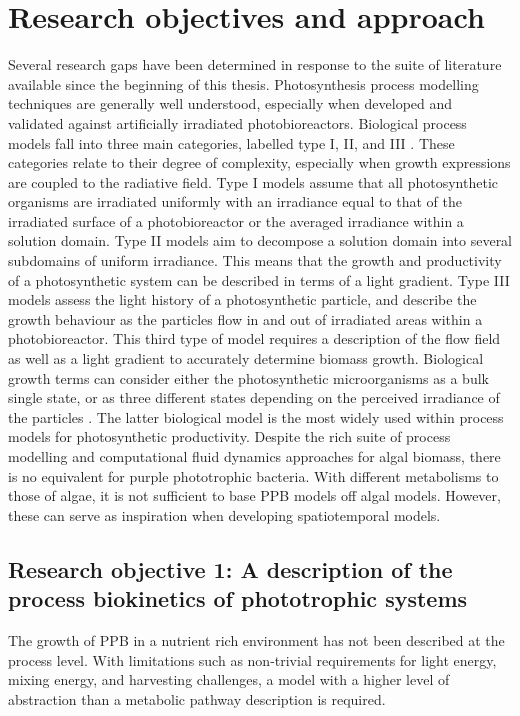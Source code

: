 \section{Research objectives and approach}
\label{Intro:Objectives}
Several research gaps have been determined in response to the suite of literature available since the beginning of this thesis. Photosynthesis process modelling techniques are generally well understood, especially when developed and validated against artificially irradiated photobioreactors. Biological process models fall into three main categories, labelled type I, II, and III \cite{bechet2013}. These categories relate to their degree of complexity, especially when growth expressions are coupled to the radiative field. Type I models assume that all photosynthetic organisms are irradiated uniformly with an irradiance equal to that of the irradiated surface of a photobioreactor or the averaged irradiance within a solution domain. Type II models aim to decompose a solution domain into several subdomains of uniform irradiance. This means that the growth and productivity of a photosynthetic system can be described in terms of a light gradient. Type III models assess the light history of a photosynthetic particle, and describe the growth behaviour as the particles flow in and out of irradiated areas within a photobioreactor. This third type of model requires a description of the flow field as well as a light gradient to accurately determine biomass growth. Biological growth terms can consider either the photosynthetic microorganisms as a bulk single state, or as three different states depending on the perceived irradiance of the particles \cite{eilers1988}. The latter biological model is the most widely used within process models for photosynthetic productivity. Despite the rich suite of process modelling and computational fluid dynamics approaches for algal biomass, there is no equivalent for purple phototrophic bacteria. With different metabolisms to those of algae, it is not sufficient to base PPB models off algal models. However, these can serve as inspiration when developing spatiotemporal models.

\subsection{Research objective 1: A description of the process biokinetics of phototrophic systems}
The growth of PPB in a nutrient rich environment has not been described at the process level. With limitations such as non-trivial requirements for light energy, mixing energy, and harvesting challenges, a model with a higher level of abstraction than a metabolic pathway description is required.

